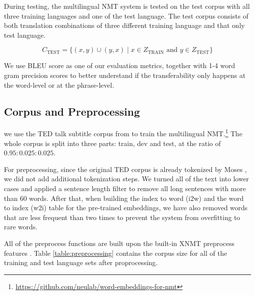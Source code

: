 \documentclass[thesis,fonts=libertine]{cluu}
\begin{document}
During testing, the multilingual NMT system is tested on the test corpus with all three training languages and one of the test language. The test corpus consists of both translation combinations of three different training language and that only test language.

\begin{equation*}
  C_{\text{TEST}} = \{(x, y)\cup(y,x) \mid x \in Z_{\text{TRAIN}} \text{ and } y \in Z_{\text{TEST}}\}
\end{equation*}

We use BLEU score \parencite{papineni-etal-2002-bleu} as one of our evaluation metrics, together with 1-4 word gram precision scores to better understand if the transferability only happens at the word-level or at the phrase-level.

\subsection{Corpus and Preprocessing}

we use the TED talk subtitle corpus from \textcite{Qi:2018aa} to train the multilingual NMT.\footnote{\url{https://github.com/neulab/word-embeddings-for-nmt}} The whole corpus is split into three parts: train, dev and test, at the ratio of $0.95:0.025:0.025$.

For preprocessing, since the original TED corpus is already tokenized by Moses \parencite{koehn-etal-2007-moses}, we did not add additional tokenization steps. We turned all of the text into lower cases and applied a sentence length filter to remove all long sentences with more than 60 words. After that, when building the index to word (i2w) and the word to index (w2i) table for the pre-trained embeddings, we have also removed words that are less frequent than two times to prevent the system from overfitting to rare words.

All of the preprocess functions are built upon the built-in XNMT preprocess features \parencite{Neubig:2018aa}. Table \ref{table:preprocessing} contains the corpus size for all of the training and test language sets after proprocessing.
\end{document}

